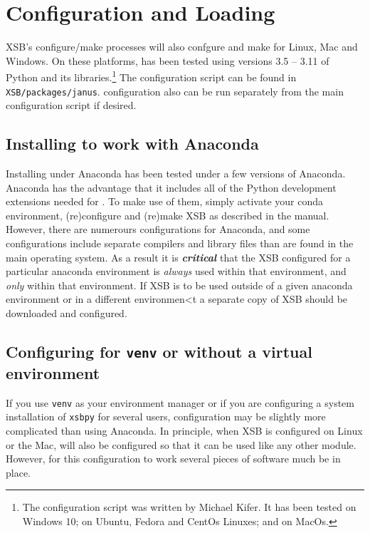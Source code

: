 \section{Configuration and Loading}

XSB's configure/make processes will also confgure and make \janus{}
for Linux, Mac and Windows.  On these platforms, \janusplg{} has been
tested using versions 3.5 -- 3.11 of Python and its
libraries.\footnote{The
\janusplg{} configuration script was written by Michael Kifer.  It has
been tested on Windows 10; on Ubuntu, Fedora and CentOs Linuxes; and
on MacOs.}  The \janusplg configuration script can be found in {\tt
XSB/packages/janus}.  \janusplg configuration also can be run
separately from the main configuration script if desired.

\subsection{Installing \janusplg{} to work with Anaconda}

Installing \janusplg under Anaconda has been tested under a few
versions of Anaconda.  Anaconda has the advantage that it includes all
of the Python development extensions needed for \janusplg.  To make
use of them, simply activate your conda environment, (re)configure and
(re)make XSB as described in the manual.  However, there are numerours
configurations for Anaconda, and some configurations include separate
compilers and library files than are found in the main operating
system.  As a result it is {\em {\bf critical}} that the XSB
configured for a particular anaconda environment is {\em always} used
within that environment, and {\em only} within that environment.  If
XSB is to be used outside of a given anaconda environment or in a
different environmen<t a separate copy of XSB should be downloaded and
configured.

\subsection{Configuring \janusplg{} for {\tt venv} or without a virtual environment} \label{sec:xsbpy-linux}

If you use {\tt venv} as your environment manager or if you are
configuring a system installation of {\tt xsbpy} for several users,
configuration may be slightly more complicated than using Anaconda.
In principle, when XSB is configured on Linux or the Mac, \janusplg{}
will also be configured so that it can be used like any other 
module.  However, for this configuration to work several pieces of
software much be in place.

